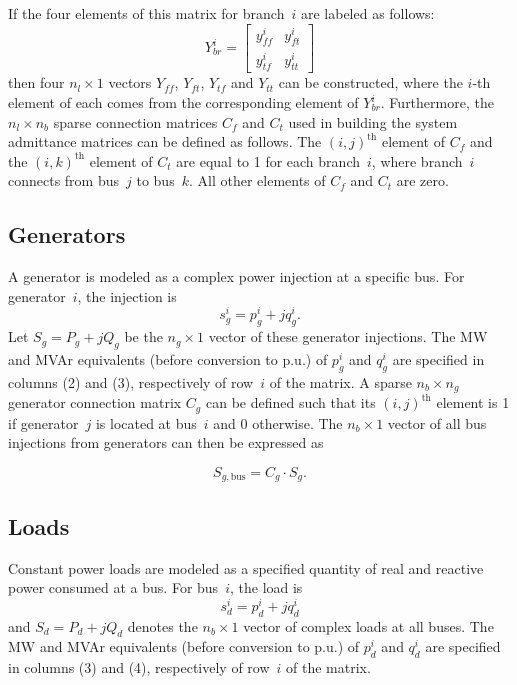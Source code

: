 \documentclass[12pt]{article}
\newcommand{\code}[1]{{\relsize{-0.5}{\tt{{#1}}}}}  %
\newcommand{\bus}[0]{\code{bus}}
\newcommand{\gen}[0]{\code{gen}}
\numberwithin{equation}{section}
\numberwithin{table}{section}
\numberwithin{figure}{section}
\begin{document}
If the four elements of this matrix for branch~$i$ are labeled as follows:
\begin{equation}
Y_{br}^i = \left[\begin{array}{cc}
y_{f\!f}^i & y_{ft}^i \\
y_{t\!f}^i & y_{tt}^i
\end{array}\right]
\label{eq:Ybri}
\end{equation}
then four $n_l \times 1$ vectors $Y_{f\!f}$, $Y_{ft}$, $Y_{t\!f}$ and $Y_{tt}$ can be constructed, where the $i$-th element of each comes from the corresponding element of $Y_{br}^i$. Furthermore, the $n_l \times n_b$ sparse connection matrices $C_f$ and $C_t$ used in building the system admittance matrices can be defined as follows. The $(i,j)^\mathrm{th}$ element of $C_f$ and the $(i,k)^\mathrm{th}$ element of $C_t$ are equal to 1 for each branch~$i$, where branch~$i$ connects from bus~$j$ to bus~$k$. All other elements of $C_f$ and $C_t$ are zero.


\subsection{Generators}

A generator is modeled as a complex power injection at a specific bus. For generator~$i$, the injection is
\begin{equation}
s^i_g = p^i_g + j q^i_g.
\end{equation}
Let $S_g = P_g + j Q_g$ be the $n_g \times 1$ vector of these generator injections. The MW and MVAr equivalents (before conversion to p.u.) of $p^i_g$ and $q^i_g$ are specified in columns \code{PG} (2) and \code{QG} (3), respectively of row~$i$ of the \gen{} matrix. A sparse $n_b \times n_g$ generator connection matrix $C_g$ can be defined such that its $(i,j)^\mathrm{th}$ element is 1 if generator~$j$ is located at bus~$i$ and 0 otherwise. The $n_b \times 1$ vector of all bus injections from generators can then be expressed as

\begin{equation}
S_{g,\mathrm{bus}} = C_g \cdot S_g.
\end{equation}

\subsection{Loads}

Constant power loads are modeled as a specified quantity of real and reactive power consumed at a bus. For bus~$i$, the load is
\begin{equation}
s^i_d = p^i_d + j q^i_d
\end{equation}
and $S_d = P_d + j Q_d$ denotes the $n_b \times 1$ vector of complex loads at all buses. The MW and MVAr equivalents (before conversion to p.u.) of $p^i_d$ and $q^i_d$ are specified in columns \code{PD} (3) and \code{QD} (4), respectively of row~$i$ of the \bus{} matrix.
\end{document}
